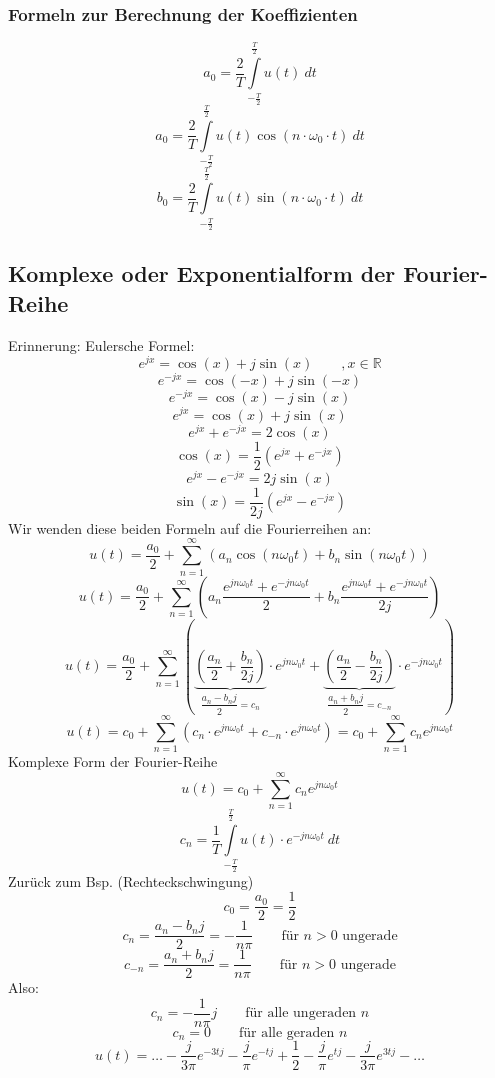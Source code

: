 \subsubsection{Formeln zur Berechnung der Koeffizienten}
\[ a_0 = \frac{2}{T} \int\limits_{-\frac{T}{2}}^{\frac{T}{2}} u(t) ~ dt \]
\[ a_0 = \frac{2}{T} \int\limits_{-\frac{T}{2}}^{\frac{T}{2}} u(t) 
\cos(n \cdot \omega_0 \cdot t) ~ dt \]
\[ b_0 = \frac{2}{T} \int\limits_{-\frac{T}{2}}^{\frac{T}{2}} u(t) 
\sin(n \cdot \omega_0 \cdot t) ~ dt \]

\subsection{Komplexe oder Exponentialform der Fourier-Reihe}
Erinnerung: Eulersche Formel: 
\[ e^{j x} = \cos(x) + j \sin(x) \qquad , x \in \mathbb{R} \]
\[ e^{- j x} = \cos(-x) + j \sin(-x) \]
\[ e^{- j x} = \cos(x) - j \sin(x) \]
\[ e^{j x} = \cos(x) + j \sin(x) \]
\[ e^{jx} + e^{-jx} = 2 \cos(x) \]
\[ \boxed{\cos(x) = \frac{1}{2} (e^{jx} + e^{-jx})} \]
\[ e^{jx} - e^{-jx} = 2 j \sin(x) \]
\[ \boxed{\sin(x) = \frac{1}{2j} (e^{jx} - e^{-jx})} \]
Wir wenden diese beiden Formeln auf die Fourierreihen an: 
\[ u(t) = \frac{a_0}{2} + \sum\limits_{n = 1}^{\infty} (a_n \cos(n \omega_0 t) 
+ b_n \sin(n \omega_0 t)) \]
\[ u(t) = \frac{a_0}{2} + \sum\limits_{n = 1}^{\infty} 
(a_n \frac{e^{j n \omega_0 t} + e^{-j n \omega_0 t}}{2} 
+ b_n \frac{e^{j n \omega_0 t} + e^{-j n \omega_0 t}}{2 j}) \]
\[ u(t) = \frac{a_0}{2} + \sum_{n = 1}^{\infty} \left(
\underbrace{\left(\frac{a_n}{2} + \frac{b_n}{2j}\right)}
_{\dfrac{a_n - b_n j}{2} = c_n} \cdot e^{j n \omega_0 t} + 
\underbrace{\left(\frac{a_n}{2} - \frac{b_n}{2j}\right)}
_{\dfrac{a_n + b_n j}{2} = c_{-n}}\cdot e^{-j n \omega_0 t}
\right) \]
\[ u(t) = c_0 + \sum\limits_{n = 1}^{\infty} \left(c_n \cdot e^{j n \omega_0 t} 
+ c_{-n} \cdot e^{j n \omega_0 t}\right) 
= c_0 + \sum\limits_{n = 1}^{\infty} c_n e^{j n \omega_0 t} \]
Komplexe Form der Fourier-Reihe
\[ u(t) = c_0 + \sum\limits_{n = 1}^{\infty} c_n e^{j n \omega_0 t} \]
\[ c_n = \frac{1}{T} \int\limits_{-\frac{T}{2}}^{\frac{T}{2}} 
u(t) \cdot e^{-j n \omega_0 t} ~ dt \]
Zurück zum Bsp. (Rechteckschwingung)
\[ c_0 = \frac{a_0}{2} = \frac{1}{2} \]
\[ c_n = \frac{a_n - b_n j}{2} = -\frac{1}{n \pi} 
\qquad \text{für }n > 0\text{ ungerade} \]
\[ c_{-n} = \frac{a_n + b_n j}{2} = \frac{1}{n \pi} 
\qquad \text{für }n > 0\text{ ungerade} \]
Also: 
\[ c_n = -\frac{1}{n \pi} j \qquad \text{für alle ungeraden }n\]
\[ c_n = 0 \qquad \text{für alle geraden }n\]
\[ u(t) = \ldots - \frac{j}{3 \pi} e^{-3 t j} - \frac{j}{\pi} e^{-t j} 
+ \frac{1}{2} - \frac{j}{\pi} e^{t j} - \frac{j}{3 \pi} e^{3 t j} - \ldots \]
